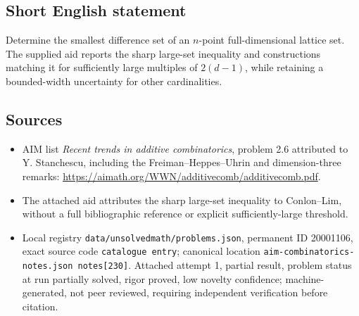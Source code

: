 \documentclass[11pt]{article}
\begin{document}
\subsection{Short English statement}
Determine the smallest difference set of an $n$-point full-dimensional lattice set. The supplied aid reports the sharp large-set inequality and constructions matching it for sufficiently large multiples of $2(d-1)$, while retaining a bounded-width uncertainty for other cardinalities.
\subsection{Sources}
\begin{itemize}
\item AIM list \emph{Recent trends in additive combinatorics}, problem 2.6 attributed to Y. Stanchescu, including the Freiman--Heppes--Uhrin and dimension-three remarks: \url{https://aimath.org/WWN/additivecomb/additivecomb.pdf}.
\item The attached aid attributes the sharp large-set inequality to Conlon--Lim, without a full bibliographic reference or explicit sufficiently-large threshold.
\item Local registry \texttt{data/unsolvedmath/problems.json}, permanent ID 20001106, exact source code \texttt{catalogue entry}; canonical location \texttt{aim-combinatorics-notes.json notes[230]}. Attached attempt 1, partial result, problem status at run partially solved, rigor proved, low novelty confidence; machine-generated, not peer reviewed, requiring independent verification before citation.
\end{itemize}
\end{document}
